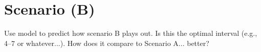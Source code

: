 \chapter{Scenario (B)}\label{ch:scenarioB} 
Use model to predict how scenario B plays out. Is this the optimal interval (e.g., 4--7 or whatever...). How does it compare to Scenario A... better? 